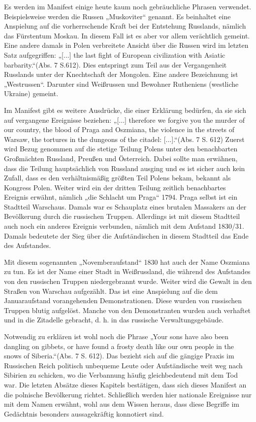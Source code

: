 \documentclass{../../sem_paper}
\begin{document}
Es werden im Manifest einige heute kaum noch gebräuchliche Phrasen verwendet. Beispielsweise
werden die Russen „Muskoviter“ genannt. Es beinhaltet eine Anspielung auf die vorherrschende
Kraft bei der Entstehung Russlands, nämlich das Fürstentum Moskau. In diesem Fall ist es aber vor
allem verächtlich gemeint. Eine andere damals in Polen verbreitete Ansicht über die Russen wird im
letzten Satz aufgegriffen: „[...] the last fight of European civilization with Asiatic barbarity.“(Abs. 7
S.612). Dies entspringt zum Teil aus der Vergangenheit Russlands unter der Knechtschaft der
Mongolen. Eine andere Bezeichnung ist „Westrussen“. Darunter sind Weißrussen und Bewohner
Rutheniens (westliche Ukraine) gemeint.

Im Manifest gibt es weitere Ausdrücke, die einer Erklärung bedürfen, da sie sich auf vergangene
Ereignisse beziehen: „[...] therefore we forgive you the murder of our country, the blood of Praga
and Oszmiana, the violence in the streets of Warsaw, the tortures in the dungeons of the citadel:
[...].“(Abs. 7 S. 612) Zuerst wird Bezug genommen auf die stetige Teilung Polens unter den
benachbarten Großmächten Russland, Preußen und Österreich. Dabei sollte man erwähnen, dass die
Teilung hauptsächlich von Russland ausging und es ist sicher auch kein Zufall, dass es den
verhältnismäßig größten Teil Polens bekam, bekannt als Kongress Polen. Weiter wird ein der dritten
Teilung zeitlich benachbartes Ereignis erwähnt, nämlich „die Schlacht um Praga“ 1794. Praga selbst
ist ein Stadtteil Warschaus. Damals war es Schauplatz eines brutalen Massakers an der Bevölkerung
durch die russischen Truppen. Allerdings ist mit diesem Stadtteil auch noch ein anderes Ereignis
verbunden, nämlich mit dem Aufstand 1830/31. Damals bedeutete der Sieg über die Aufständischen
in diesem Stadtteil das Ende des Aufstandes.

Mit diesem sogenannten „Novemberaufstand“ 1830 hat auch der Name Oszmiana zu tun. Es ist der
Name einer Stadt in Weißrussland, die während des Aufstandes von den russischen Truppen
niedergebrannt wurde. Weiter wird die Gewalt in den Straßen von Warschau aufgezählt. Das ist eine
Anspielung auf die dem Januaraufstand vorangehenden Demonstrationen. Diese wurden von
russischen Truppen blutig aufgelöst. Manche von den Demonstranten wurden auch verhaftet und in
die Zitadelle gebracht, d. h. in das russische Verwaltungsgebäude.

Notwendig zu erklären ist wohl noch die Phrase „Your sons have also been dangling on gibbets, or
have found a frosty death like our own people in the snows of Siberia.“(Abs. 7 S. 612). Das bezieht
sich auf die gängige Praxis im Russischen Reich politisch unbequeme Leute oder Aufständische
weit weg nach Sibirien zu schicken, wo die Verbannung häufig gleichbedeutend mit dem Tod war.
Die letzten Absätze dieses Kapitels bestätigen, dass sich dieses Manifest an die polnische
Bevölkerung richtet. Schließlich werden hier nationale Ereignisse nur mit dem Namen erwähnt,
wohl aus dem Wissen heraus, dass diese Begriffe im Gedächtnis besonders aussagekräftig
konnotiert sind.
\end{document}
